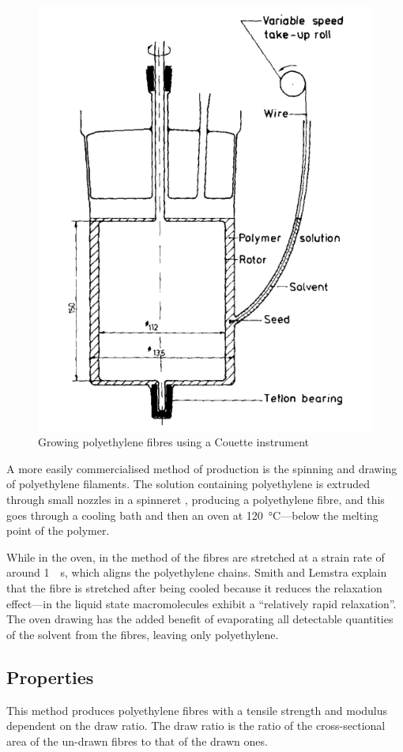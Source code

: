\begin{figure}
\centering
\includegraphics[width=0.8\columnwidth]{images/growing_polyethylene}
\caption{Growing polyethylene fibres using a Couette instrument }
\label{fig:grow_pe}
\end{figure}

A more easily commercialised method of production is the spinning and drawing of polyethylene filaments. The solution containing polyethylene is extruded through small nozzles in a spinneret , producing a polyethylene fibre, and this goes through a cooling bath and then an oven at \SI{120}{\celsius}---below the melting point of the polymer.

While in the oven, in the method of \cite{smith_ultra-high-strength_1980} the fibres are stretched at a strain rate of around \SI{1}{\per\second}, which aligns the polyethylene chains. Smith and Lemstra explain that the fibre is stretched after being cooled because it reduces the relaxation effect---in the liquid state macromolecules exhibit a ``relatively rapid relaxation''. The oven drawing has the added benefit of evaporating all detectable quantities of the solvent from the fibres, leaving only polyethylene.

\subsection{Properties}
This method produces polyethylene fibres with a tensile strength and modulus dependent on the draw ratio. The draw ratio is the ratio of the cross-sectional area of the un-drawn fibres to that of the drawn ones.

